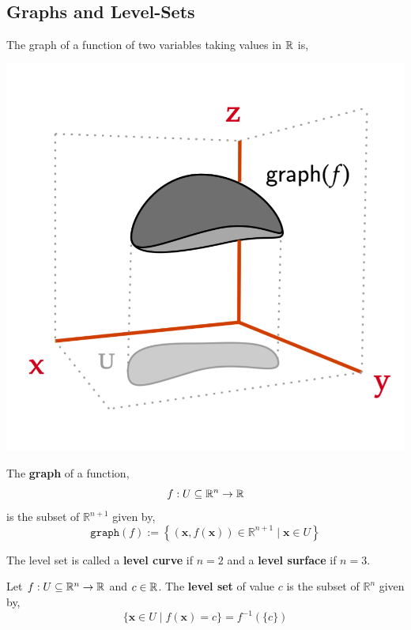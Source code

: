 \subsection{Graphs and Level-Sets}
\begin{marginfigure}
The graph of a function of two variables taking values in $\mathbb{R}$ is,
\begin{center}
       \includegraphics[width=\textwidth]{figures/wk-1/fig-4.png}
\end{center}
\end{marginfigure}

\begin{defn}
     The \textbf{graph} of a function,
     \[f: U \subseteq \mathbb{R}^n \rightarrow \mathbb{R}\]
     is the subset of $\mathbb{R}^{n+1}$ given by,
     \[\texttt{graph}(f) := \left\{(\mathbf{x}, f(\mathbf{x})) \in \mathbb{R}^{n+1} \mid \mathbf{x} \in U\right\}\]
\end{defn}

\begin{marginfigure}
    The level set is called a \textbf{level curve} if $n = 2$ and a \textbf{level surface} if $n = 3$.
\end{marginfigure}

\begin{defn}
     Let $f: U \subseteq \mathbb{R}^n \rightarrow \mathbb{R}$ and $c \in \mathbb{R}$. The \textbf{level set} of value $c$ is the subset of $\mathbb{R}^{n}$ given by,
     \[\{\mathbf{x} \in U \mid f(\mathbf{x}) = c\} = f^{-1}(\{c\})\]
\end{defn}

